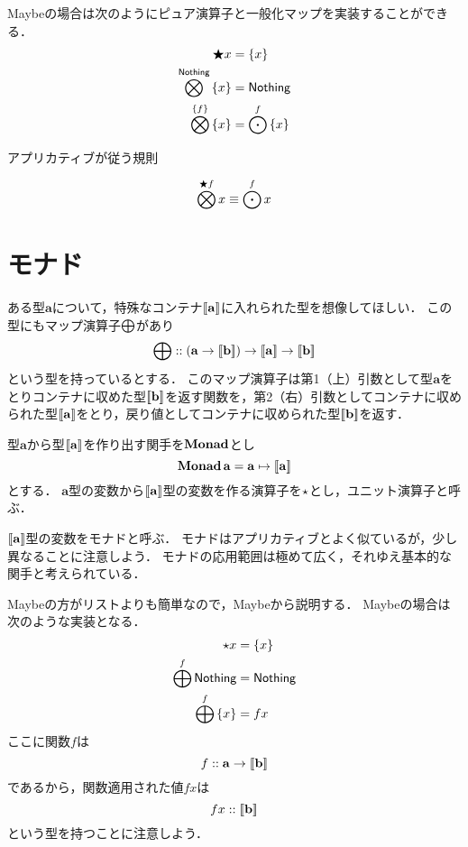\documentclass[twocolumn]{jsbook}
\newcommand{\typename}[1]{\mathbf{#1}}
\begin{document}
Maybeの場合は次のようにピュア演算子と一般化マップを実装することができる．
\begin{align*}
\bigstar x&=\left\{x\right\}\\
\bigotimes^{\textsf{Nothing}}\left\{x\right\}&=\textsf{Nothing}\\
\bigotimes^{\left\{f\right\}}\left\{x\right\}&=\bigodot^f\left\{x\right\}
\end{align*}



アプリカティブが従う規則

$$\bigotimes^{\bigstar f}x\equiv\bigodot^fx$$

\section{モナド}

ある型$\typename{a}$について，特殊なコンテナ$\monad{\typename{a}}$に入れられた型を想像してほしい．
この型にもマップ演算子$\bigoplus$があり$$\monadfunc::\left(\typename{a}\rightarrow\monad{\typename{b}}\right)\rightarrow\monad{\typename{a}}\rightarrow{\monad{\typename{b}}}$$という型を持っているとする．
このマップ演算子は第1（上）引数として型$\typename{a}$をとりコンテナに収めた型$\monad{\typename{b}}$を返す関数を，第2（右）引数としてコンテナに収められた型$\monad{\typename{a}}$をとり，戻り値としてコンテナに収められた型$\monad{\typename{b}}$を返す．

型$\typename{a}$から型$\monad{\typename{a}}$を作り出す関手を$\mathop{\mathop{\textbf{Monad}}}$とし$$\monadfunctor\typename{a}=\typename{a}\mapsto\monad{\typename{a}}$$とする．
$\typename{a}$型の変数から$\monad{\typename{a}}$型の変数を作る演算子を$\star$とし，ユニット演算子と呼ぶ．

$\monad{\typename{a}}$型の変数をモナドと呼ぶ．
モナドはアプリカティブとよく似ているが，少し異なることに注意しよう．
モナドの応用範囲は極めて広く，それゆえ基本的な関手と考えられている．

Maybeの方がリストよりも簡単なので，Maybeから説明する．
Maybeの場合は次のような実装となる．
\begin{align*}
\star x&=\left\{x\right\}\\
\bigoplus^f\textsf{Nothing}&=\textsf{Nothing}\\
\bigoplus^f\left\{x\right\}&=fx
\end{align*}
ここに関数$f$は$$f::\typename{a}\rightarrow\monad{\typename{b}}$$であるから，関数適用された値$fx$は$$fx::\monad{\typename{b}}$$という型を持つことに注意しよう．
\end{document}
